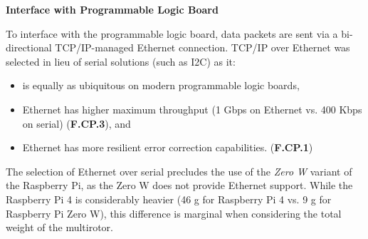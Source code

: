 \textbf{Interface with Programmable Logic Board}

To interface with the programmable logic board, data packets are sent via a bi-directional TCP/IP-managed Ethernet connection. TCP/IP over Ethernet was selected in lieu of serial solutions (such as I2C) as it:
\begin{itemize}
\item is equally as ubiquitous on modern programmable logic boards,
\item Ethernet has higher maximum throughput (1 Gbps on Ethernet vs. 400 Kbps on serial) (\textbf{F.CP.3}), and
\item Ethernet has more resilient error correction capabilities. (\textbf{F.CP.1})
\end{itemize} 

The selection of Ethernet over serial precludes the use of the \textit{Zero W} variant of the Raspberry Pi, as the Zero W does not provide Ethernet support. While the Raspberry Pi 4 is considerably heavier (46 g for Raspberry Pi 4 vs. 9 g for Raspberry Pi Zero W), this difference is marginal when considering the total weight of the multirotor.
